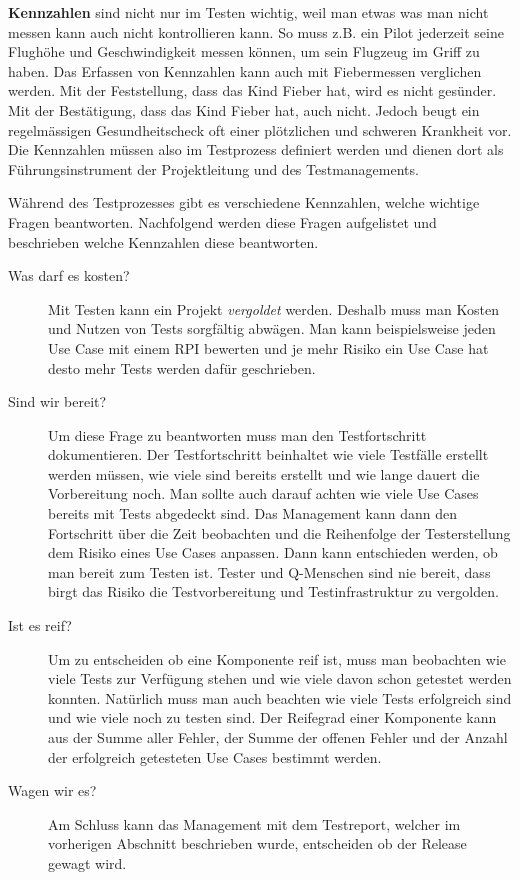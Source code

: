 \textbf{Kennzahlen} sind nicht nur im Testen wichtig, weil man etwas was man nicht messen kann auch nicht kontrollieren kann. So muss z.B. ein Pilot jederzeit seine Flughöhe und Geschwindigkeit messen können, um sein Flugzeug im Griff zu haben. Das Erfassen von Kennzahlen kann auch mit Fiebermessen verglichen werden. Mit der Feststellung, dass das Kind Fieber hat, wird es nicht gesünder. Mit der Bestätigung, dass das Kind Fieber hat, auch nicht. Jedoch beugt ein regelmässigen Gesundheitscheck oft einer plötzlichen und schweren Krankheit vor. Die Kennzahlen müssen also im Testprozess definiert werden und dienen dort als Führungsinstrument der Projektleitung und des Testmanagements.

Während des Testprozesses gibt es verschiedene Kennzahlen, welche wichtige Fragen beantworten. Nachfolgend werden diese Fragen aufgelistet und beschrieben welche Kennzahlen diese beantworten.
\begin{description}
	\item[Was darf es kosten?] Mit Testen kann ein Projekt \textit{vergoldet} werden. Deshalb muss man Kosten und Nutzen von Tests sorgfältig abwägen. Man kann beispielsweise jeden Use Case mit einem RPI bewerten und je mehr Risiko ein Use Case hat desto mehr Tests werden dafür geschrieben.
	\item[Sind wir bereit?] Um diese Frage zu beantworten muss man den Testfortschritt dokumentieren. Der Testfortschritt beinhaltet wie viele Testfälle erstellt werden müssen, wie viele sind bereits erstellt und wie lange dauert die Vorbereitung noch. Man sollte auch darauf achten wie viele Use Cases bereits mit Tests abgedeckt sind. Das Management kann dann den Fortschritt über die Zeit beobachten und die Reihenfolge der Testerstellung dem Risiko eines Use Cases anpassen. Dann kann entschieden werden, ob man bereit zum Testen ist. Tester und Q-Menschen sind nie bereit, dass birgt das Risiko die Testvorbereitung und Testinfrastruktur zu vergolden.
	\item[Ist es reif?] Um zu entscheiden ob eine Komponente reif ist, muss man beobachten wie viele Tests zur Verfügung stehen und wie viele davon schon getestet werden konnten. Natürlich muss man auch beachten wie viele Tests erfolgreich sind und wie viele noch zu testen sind. Der Reifegrad einer Komponente kann aus der Summe aller Fehler, der Summe der offenen Fehler und der Anzahl der erfolgreich getesteten Use Cases bestimmt werden.
	\item[Wagen wir es?] Am Schluss kann das Management mit dem Testreport, welcher im vorherigen Abschnitt beschrieben wurde, entscheiden ob der Release gewagt wird.
\end{description}

